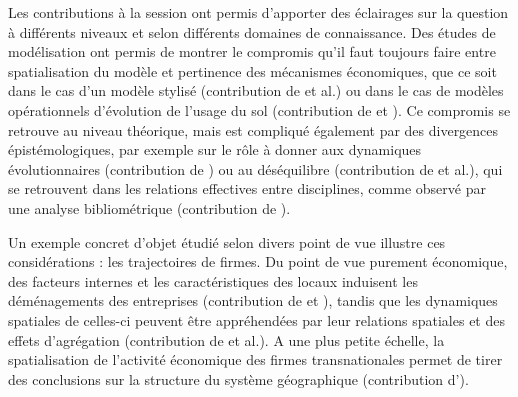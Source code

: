 

Les contributions à la session ont permis d'apporter des éclairages sur la question à différents niveaux et selon différents domaines de connaissance. Des études de modélisation ont permis de montrer le compromis qu'il faut toujours faire entre spatialisation du modèle et pertinence des mécanismes économiques, que ce soit dans le cas d'un modèle stylisé (contribution de  et al.) ou dans le cas de modèles opérationnels d'évolution de l'usage du sol (contribution de  et ). Ce compromis se retrouve au niveau théorique, mais est compliqué également par des divergences épistémologiques, par exemple sur le rôle à donner aux dynamiques évolutionnaires (contribution de ) ou au déséquilibre (contribution de  et al.), qui se retrouvent dans les relations effectives entre disciplines, comme observé par une analyse bibliométrique (contribution de ).

Un exemple concret d'objet étudié selon divers point de vue illustre ces considérations : les trajectoires de firmes. Du point de vue purement économique, des facteurs internes et les caractéristiques des locaux induisent les déménagements des entreprises (contribution de  et ), tandis que les dynamiques spatiales de celles-ci peuvent être appréhendées par leur relations spatiales et des effets d'agrégation (contribution de  et al.). A une plus petite échelle, la spatialisation de l'activité économique des firmes transnationales permet de tirer des conclusions sur la structure du système géographique (contribution d').

